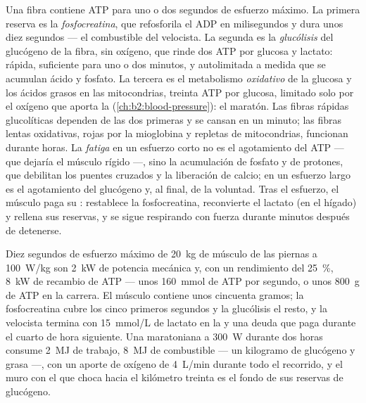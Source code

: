 \begin{proposition}\label{prop:b2:muscle-movement:energy}
Una fibra contiene ATP para uno o dos segundos de esfuerzo máximo. La
primera reserva es la \emph{fosfocreatina}, que refosforila el ADP en
milisegundos y dura unos diez segundos --- el combustible del velocista.
La segunda es la \emph{glucólisis} del glucógeno de la fibra, sin oxígeno,
que rinde dos ATP por glucosa y lactato: rápida, suficiente para uno o dos
minutos, y autolimitada a medida que se acumulan ácido y fosfato. La
tercera es el metabolismo \emph{oxidativo} de la glucosa y los ácidos
grasos en las mitocondrias, treinta ATP por glucosa, limitado solo por el
oxígeno que aporta la 
(\cref{ch:b2:blood-pressure}): el maratón. Las fibras rápidas glucolíticas
dependen de las dos primeras y se cansan en un minuto; las fibras lentas
oxidativas, rojas por la mioglobina y repletas de mitocondrias, funcionan
durante horas. La \emph{fatiga} en un esfuerzo corto no es el agotamiento
del ATP --- que dejaría el músculo rígido ---, sino la acumulación de
fosfato y de protones, que debilitan los puentes cruzados y la liberación
de calcio; en un esfuerzo largo es el agotamiento del glucógeno y, al
final, de la voluntad. Tras el esfuerzo, el músculo paga su \emph{}: restablece la fosfocreatina, reconvierte el lactato (en el
hígado) y rellena sus reservas, y se sigue respirando con fuerza durante
minutos después de detenerse.
\end{proposition}

\begin{example}\label{ex:b2:muscle-movement:sprint}
Diez segundos de esfuerzo máximo de \qty{20}{kg} de músculo de las piernas
a \qty{100}{W/kg} son \qty{2}{kW} de potencia mecánica y, con un
rendimiento del \qty{25}{\%}, \qty{8}{kW} de recambio de ATP --- unos
\qty{160}{mmol} de ATP por segundo, o unos \qty{800}{g} de ATP en la
carrera. El músculo contiene unos cincuenta gramos; la fosfocreatina cubre los
cinco primeros segundos y la glucólisis el resto, y la velocista termina
con \qty{15}{mmol/L} de lactato en la  y una deuda que paga durante
el cuarto de hora siguiente. Una maratoniana a \qty{300}{W} durante dos
horas consume \qty{2}{MJ} de trabajo, \qty{8}{MJ} de combustible --- un
kilogramo de glucógeno y grasa ---, con un aporte de oxígeno de
\qty{4}{L/min} durante todo el recorrido, y el muro con el que choca hacia
el kilómetro treinta es el fondo de sus reservas de glucógeno.
\end{example}

